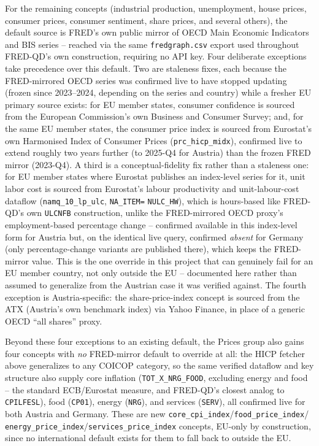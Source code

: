 \documentclass[11pt]{article}
\begin{document}
For the remaining concepts (industrial production, unemployment, house
prices, consumer prices, consumer sentiment, share prices, and several
others), the default source is FRED's own public mirror of OECD Main
Economic Indicators and BIS series -- reached via the same
\texttt{fredgraph.csv} export used throughout FRED-QD's own construction,
requiring no API key. Four deliberate exceptions take precedence over this
default. Two are staleness fixes, each because the FRED-mirrored OECD
series was confirmed live to have stopped updating (frozen since
2023--2024, depending on the series and country) while a fresher EU
primary source exists: for EU member states, consumer confidence is
sourced from the European Commission's own Business and Consumer Survey;
and, for the same EU member states, the consumer price index is sourced
from Eurostat's own Harmonised Index of Consumer Prices
(\texttt{prc\_hicp\_midx}), confirmed live to extend roughly two years
further (to 2025-Q4 for Austria) than the frozen FRED mirror (2023-Q4). A
third is a conceptual-fidelity fix rather than a staleness one: for EU
member states where Eurostat publishes an index-level series for it, unit
labor cost is sourced from Eurostat's labour productivity and
unit-labour-cost dataflow (\texttt{namq\_10\_lp\_ulc}, \texttt{NA\_ITEM=}
\texttt{NULC\_HW}), which is hours-based like FRED-QD's own \texttt{ULCNFB}
construction, unlike the FRED-mirrored OECD proxy's employment-based
percentage change -- confirmed available in this index-level form for
Austria but, on the identical live query, confirmed \emph{absent} for
Germany (only percentage-change variants are published there), which
keeps the FRED-mirror value. This is the one override in this project
that can genuinely fail for an EU member country, not only outside the
EU -- documented here rather than assumed to generalize from the Austrian
case it was verified against. The fourth exception is Austria-specific:
the share-price-index concept is sourced from the ATX (Austria's own
benchmark index) via Yahoo Finance, in place of a generic OECD ``all
shares'' proxy.

Beyond these four exceptions to an existing default, the Prices group
also gains four concepts with \emph{no} FRED-mirror default to override
at all: the HICP fetcher above generalizes to any COICOP category, so the
same verified dataflow and key structure also supply core inflation
(\texttt{TOT\_X\_NRG\_FOOD}, excluding energy and food -- the standard
ECB/Eurostat measure, and FRED-QD's closest analog to \texttt{CPILFESL}),
food (\texttt{CP01}), energy (\texttt{NRG}), and services
(\texttt{SERV}), all confirmed live for both Austria and Germany. These
are new \texttt{core\_cpi\_index}/\texttt{food\_price\_index}/
\texttt{energy\_price\_index}/\texttt{services\_price\_index} concepts,
EU-only by construction, since no international default exists for them
to fall back to outside the EU.
\end{document}
